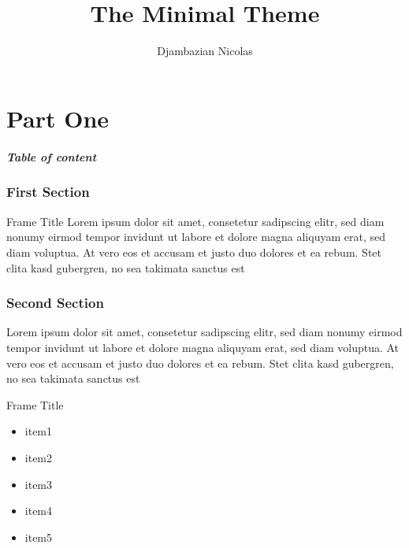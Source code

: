 \documentclass[12pt, francais]{beamer}
\title{The Minimal Theme}
\author{Djambazian Nicolas}
\begin{document}
\maketitle

\part{Part One}
\framepartpage

\begin{frame}
	\frametitle{Table of content}
	\tableofcontents[hideallsubsections]
\end{frame}

\section{First Section }

\begin{frame}{Frame Title}
	Lorem ipsum dolor sit amet, consetetur sadipscing elitr, sed diam nonumy eirmod tempor invidunt ut labore et dolore magna aliquyam erat, sed diam voluptua. At vero eos et accusam et justo duo dolores et ea rebum. Stet clita kasd gubergren, no sea takimata sanctus est
\end{frame}


\section{Second Section }

\begin{frame}
\end{frame}


\begin{frame}
	Lorem ipsum dolor sit amet, consetetur sadipscing elitr, sed diam nonumy eirmod tempor invidunt ut labore et dolore magna aliquyam erat, sed diam voluptua. At vero eos et accusam et justo duo dolores et ea rebum. Stet clita kasd gubergren, no sea takimata sanctus est
\end{frame}



\begin{frame}{Frame Title}
\end{frame}



\begin{frame}
	  \begin{itemize}
	    \centering
	    \item item1
	    \item item2
	    \item item3
	    \item item4
	    \item item5
	  \end{itemize}
\end{frame}


\end{document}
